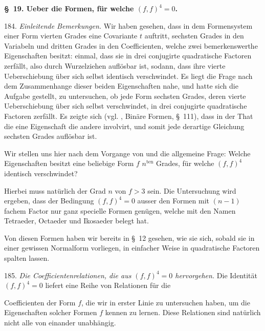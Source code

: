 \documentclass[11pt]{article}
\providecommand{\gesperrt}[1]{\textls[130]{#1}}
\providecommand{\weberpage}[1]{}
\begin{document}
\begin{center}
\textbf{\S~19. Ueber die Formen, f\"ur welche $(f,f)^4=0$.}
\end{center}

184. \textit{Einleitende Bemerkungen.} Wir haben gesehen, dass in dem Formensystem einer Form vierten Grades eine Covariante $t$ auftritt, sechsten Grades in den Variabeln und dritten Grades in den Coefficienten, welche zwei bemerkenswerthe Eigenschaften besitzt: einmal, dass sie in drei conjugirte quadratische Factoren zerf\"allt, also durch Wurzelziehen aufl\"osbar ist, sodann, dass ihre vierte Ueberschiebung \"uber sich selbst identisch verschwindet. Es liegt die Frage nach dem Zusammenhange dieser beiden Eigenschaften nahe, und \gesperrt{Clebsch} hatte sich die Aufgabe gestellt, zu untersuchen, ob jede Form sechsten Grades, deren vierte Ueberschiebung \"uber sich selbst verschwindet, in drei conjugirte quadratische Factoren zerf\"allt. Es zeigte sich (vgl. \gesperrt{Clebsch}, \glqq Bin\"are Formen\grqq{}, \S~111), dass in der That die eine Eigenschaft die andere involvirt, und somit jede derartige Gleichung sechsten Grades aufl\"osbar ist.

Wir stellen uns hier nach dem Vorgange von \gesperrt{Brioschi} und \gesperrt{Wedekind} die allgemeine Frage: Welche Eigenschaften besitzt eine beliebige Form $f$ $n^{\text{ten}}$ Grades, f\"ur welche $(f,f)^4$ identisch verschwindet?

Hierbei muss nat\"urlich der Grad $n$ von $f>3$ sein. Die Untersuchung wird ergeben, dass der Bedingung $(f,f)^4=0$ ausser den Formen mit $(n-1)$fachem Factor nur ganz specielle Formen gen\"ugen, welche \gesperrt{Klein} mit den Namen Tetraeder, Octaeder und Ikosaeder belegt hat.

Von diesen Formen haben wir bereits in \S~12 gesehen, wie sie sich, sobald sie in einer gewissen Normalform vorliegen, in einfacher Weise in quadratische Factoren spalten lassen.

185. \textit{Die Coefficientenrelationen, die aus $(f,f)^4=0$ hervorgehen.} Die Identit\"at $(f,f)^4=0$ liefert eine Reihe von Relationen f\"ur die


\weberpage{205}
Coefficienten der Form $f$, die wir in erster Linie zu untersuchen
haben, um die Eigenschaften solcher Formen $f$ kennen zu lernen.
Diese Relationen sind nat\"urlich nicht alle von einander unabh\"angig.
\end{document}

